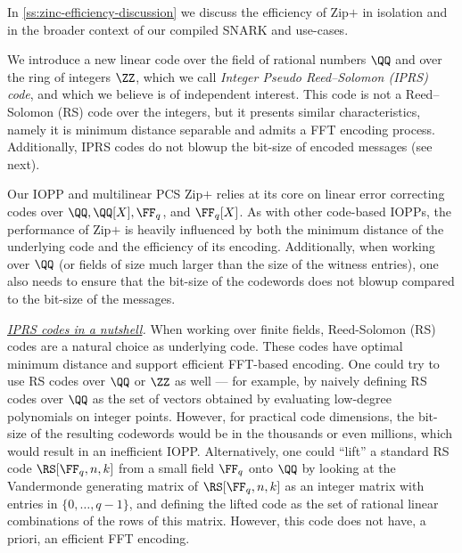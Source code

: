     In \cref{ss:zinc-efficiency-discussion} we discuss the efficiency of Zip$+$ in isolation and in the broader context of our compiled SNARK and use-cases.
    

    \medskip


%
%
We introduce a new linear code over the field of rational numbers $\QQ$ and over the ring of integers $\ZZ$, which we call \emph{Integer Pseudo Reed--Solomon (IPRS) code}, and which we believe is of independent interest. This code is not a Reed--Solomon (RS) code over the integers, but it presents similar characteristics, namely it is minimum distance separable and admits a FFT encoding process. Additionally, IPRS codes do not blowup the bit-size of encoded messages (see next). 

Our IOPP and multilinear PCS Zip$+$ relies at its core on  linear error correcting codes over $ \QQ, \QQ[X], \FF_q$, and $\FF_q[X]$. As with other code-based IOPPs, the performance of Zip$+$ is heavily influenced by both the minimum distance of the underlying code and the efficiency of its encoding. 
Additionally, when working over $\QQ$ (or fields of size much larger than the size of the witness entries), one also needs to ensure that the bit-size of the codewords does not blowup compared to the bit-size of the messages. 


\medskip

\noindent\emph{\underline{IPRS codes in a nutshell}.}
When working over finite fields, Reed-Solomon (RS) codes are a natural choice as underlying code. These codes have optimal  minimum distance and support efficient FFT-based encoding. One could try to use RS codes over $\QQ$ or $\ZZ$ as well --- for example, by naively defining RS codes over $\QQ$ as the set of vectors obtained by evaluating low-degree polynomials on integer points. However, for practical code dimensions, the bit-size of the resulting codewords would be in the thousands or even millions, which would result in an inefficient IOPP. Alternatively, one could ``lift'' a standard RS code $\RS[\FF_q, n,k]$ from a small field $\FF_q$ onto $\QQ$ by looking at the Vandermonde generating matrix of $\RS[\FF_q, n,k]$ as an integer matrix with entries in $\{0,\ldots,q-1\}$, and defining the lifted code as the set of rational linear combinations of the rows of this matrix. However, this code does not have, a priori, an efficient FFT encoding. 


